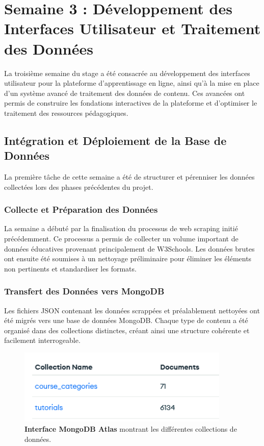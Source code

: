 \chapter{Semaine 3 : Développement des Interfaces Utilisateur et Traitement des Données}
\thispagestyle{fancy}

La troisième semaine du stage a été consacrée au développement des interfaces utilisateur pour la plateforme d'apprentissage en ligne, ainsi qu'à la mise en place d'un système avancé de traitement des données de contenu. Ces avancées ont permis de construire les fondations interactives de la plateforme et d'optimiser le traitement des ressources pédagogiques.

\section{Intégration et Déploiement de la Base de Données}

La première tâche de cette semaine a été de structurer et pérenniser les données collectées lors des phases précédentes du projet.

\subsection{Collecte et Préparation des Données}

La semaine a débuté par la finalisation du processus de web scraping initié précédemment. Ce processus a permis de collecter un volume important de données éducatives provenant principalement de W3Schools. Les données brutes ont ensuite été soumises à un nettoyage préliminaire pour éliminer les éléments non pertinents et standardiser les formats.

\subsection{Transfert des Données vers MongoDB}

Les fichiers JSON contenant les données scrappées et préalablement nettoyées ont été migrés vers une base de données MongoDB. Chaque type de contenu a été organisé dans des collections distinctes, créant ainsi une structure cohérente et facilement interrogeable.

\begin{figure}[h!]
  \centering
  \includegraphics[width=0.9\textwidth,keepaspectratio]{week_3_img/Screenshot 2025-05-19 234047.png}
  \caption{\textbf{Interface MongoDB Atlas} montrant les différentes collections de données.}
  \label{fig:mongodb_collections}
\end{figure}

